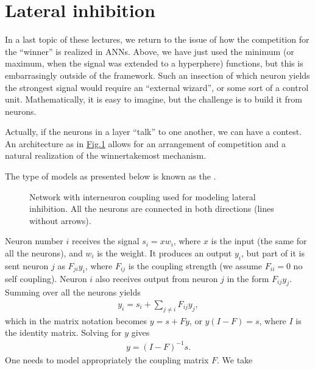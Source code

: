 \documentclass[letterpaper,10pt,english]{jupyterBook}
\let\sphinxpxdimen\pdfpxdimen\else\newdimen\sphinxpxdimen
\begin{document}
\section{Lateral inhibition}
\label{\detokenize{docs/som:lateral-inhibition}}
\sphinxAtStartPar
In a last topic of these lectures, we return to the issue of how the competition for the “winner” is realized in ANNs. Above, we have just used the minimum (or maximum, when the signal was extended to a hyperphere) functions, but this is embarrasingly outside of the framework. Such an insection of which neuron yields the strongest signal would require an “external wizard”, or some sort of a control unit. Mathematically, it is easy to imagine, but the challenge is to build it from neurons.

\sphinxAtStartPar
Actually, if the neurons in a layer “talk” to one another, we can have a contest. An architecture as in \hyperref[\detokenize{docs/som:lat-fig}]{Fig.\@ \ref{\detokenize{docs/som:lat-fig}}} allows for an arrangement of competition and a natural realization of the winner\sphinxhyphen{}take\sphinxhyphen{}most mechanism.

\sphinxAtStartPar
The type of models as presented below is known as the .

\begin{figure}[htbp]
\centering
\capstart

\noindent\sphinxincludegraphics[width=220\sphinxpxdimen]{{lat3}.png}
\caption{Network with inter\sphinxhyphen{}neuron coupling used for modeling lateral inhibition. All the neurons are connected in both directions (lines without arrows).}\label{\detokenize{docs/som:lat-fig}}\end{figure}

\sphinxAtStartPar
Neuron number \(i\) receives the signal \(s_i = x w_i\), where \(x\) is the input (the same for all the neurons), and \(w_i\) is the weight. It produces an output \(y_i\), but part of it is sent neuron \(j\) as \(F_{ji} y_i\), where \(F_{ij}\) is the coupling strength (we assume \(F_{ii}=0\) \sphinxhyphen{} no self coupling). Neuron \(i\) also receives output from neuron \(j\) in the form \(F_{ij} y_j\). Summing over all the neurons yields
\begin{equation*}
\begin{split} 
y_i = s_i + \sum_{j\neq i} F_{ij} y_j, 
\end{split}
\end{equation*}
\sphinxAtStartPar
which in the matrix notation becomes \( y = s + F y\), or \(y(I-F)=s\), where \(I\) is the identity matrix. Solving for \(y\) gives
\begin{equation}\label{equation:docs/som:eq-lat}
\begin{split}y= (I-F)^{-1} s.\end{split}
\end{equation}
\sphinxAtStartPar
One needs to model appropriately the coupling matrix \(F\). We take
\end{document}
